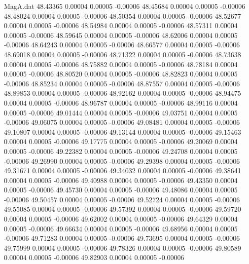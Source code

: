 \begin{filecontents}{MagA.dat}
  48.43365    0.00004    0.00005   -0.00006
  48.45684    0.00004    0.00005   -0.00006
  48.48024    0.00004    0.00005   -0.00006
  48.50354    0.00004    0.00005   -0.00006
  48.52677    0.00004    0.00005   -0.00006
  48.54984    0.00004    0.00005   -0.00006
  48.57311    0.00004    0.00005   -0.00006
  48.59645    0.00004    0.00005   -0.00006
  48.62006    0.00004    0.00005   -0.00006
  48.64243    0.00004    0.00005   -0.00006
  48.66577    0.00004    0.00005   -0.00006
  48.69018    0.00004    0.00005   -0.00006
  48.71322    0.00004    0.00005   -0.00006
  48.73638    0.00004    0.00005   -0.00006
  48.75882    0.00004    0.00005   -0.00006
  48.78184    0.00004    0.00005   -0.00006
  48.80520    0.00004    0.00005   -0.00006
  48.82823    0.00004    0.00005   -0.00006
  48.85234    0.00004    0.00005   -0.00006
  48.87557    0.00004    0.00005   -0.00006
  48.89853    0.00004    0.00005   -0.00006
  48.92162    0.00004    0.00005   -0.00006
  48.94475    0.00004    0.00005   -0.00006
  48.96787    0.00004    0.00005   -0.00006
  48.99116    0.00004    0.00005   -0.00006
  49.01444    0.00004    0.00005   -0.00006
  49.03751    0.00004    0.00005   -0.00006
  49.06075    0.00004    0.00005   -0.00006
  49.08481    0.00004    0.00005   -0.00006
  49.10807    0.00004    0.00005   -0.00006
  49.13144    0.00004    0.00005   -0.00006
  49.15463    0.00004    0.00005   -0.00006
  49.17775    0.00004    0.00005   -0.00006
  49.20069    0.00004    0.00005   -0.00006
  49.22382    0.00004    0.00005   -0.00006
  49.24708    0.00004    0.00005   -0.00006
  49.26990    0.00004    0.00005   -0.00006
  49.29398    0.00004    0.00005   -0.00006
  49.31671    0.00004    0.00005   -0.00006
  49.34032    0.00004    0.00005   -0.00006
  49.38641    0.00004    0.00005   -0.00006
  49.40988    0.00004    0.00005   -0.00006
  49.43350    0.00004    0.00005   -0.00006
  49.45730    0.00004    0.00005   -0.00006
  49.48086    0.00004    0.00005   -0.00006
  49.50457    0.00004    0.00005   -0.00006
  49.52724    0.00004    0.00005   -0.00006
  49.55085    0.00004    0.00005   -0.00006
  49.57392    0.00004    0.00005   -0.00006
  49.59720    0.00004    0.00005   -0.00006
  49.62002    0.00004    0.00005   -0.00006
  49.64329    0.00004    0.00005   -0.00006
  49.66634    0.00004    0.00005   -0.00006
  49.68956    0.00004    0.00005   -0.00006
  49.71283    0.00004    0.00005   -0.00006
  49.73695    0.00004    0.00005   -0.00006
  49.75999    0.00004    0.00005   -0.00006
  49.78326    0.00004    0.00005   -0.00006
  49.80589    0.00004    0.00005   -0.00006
  49.82903    0.00004    0.00005   -0.00006

\end{filecontents}
